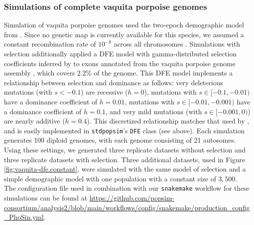 \documentclass[hidelinks]{article}
\newcommand{\stdpopsim}{\texttt{stdpopsim}\xspace}
\newcommand{\snakemake}{\texttt{snakemake}\xspace}
\begin{document}
    \subsubsection*{Simulations of complete vaquita porpoise genomes}
    Simulation of vaquita porpoise genomes used
    the two-epoch demographic model from \citet[\stdpopsim label \texttt{Vaquita2Epoch\_1R22}]{robinson2022critically}.
    Since no genetic map is currently available for this species, we assumed a constant recombination rate of $10^{-8}$
    across all chromosomes \citep{morin2021}.
    Simulations with selection additionally applied a DFE model with gamma-distributed selection coefficients inferred by
    \citet[\stdpopsim label \texttt{Gamma\_R22}]{robinson2022critically} to exons annotated from the vaquita porpoise genome assembly
    \citet[\stdpopsim label \texttt{Phocoena\_sinus.mPhoSin1.pri.110\_exons}]{morin2021},
    which covers 2.2\% of the genome. 
    This DFE model implements a relationship between selection and dominance as follows:
    very deleterious mutations (with $s<-0.1$) are recessive ($h=0$),
    mutations with $s\in [-0.1,-0.01)$ have a dominance coefficient of $h=0.01$,
    mutations with $s\in [-0.01,-0.001)$ have a dominance coefficient of $h=0.1$,
    and very mild mutations (with $s\in [-0.001,0)$) are nearly additive ($h=0.4$).
    This discretized relationship matches that used by \textcite{robinson2022critically},
    and is easily implemented in \stdpopsim's \texttt{DFE} class (see above). %
    Each simulation generates 100 diploid genomes,
    with each genome consisting of 21 autosomes.
    Using these settings, we generated three replicate datasets without selection
    and three replicate datasets with selection.
    Three additional datasets, used in Figure \ref{fig:vaquita-dfe.constant},
    were simulated with the same model of selection and a simple demographic model with one population with a constant size of $3,500$.
    The configuration file used in combination with our \snakemake workflow
    for these simulations can be found at
    \url{https://github.com/popsim-consortium/analysis2/blob/main/workflows/config/snakemake/production_config_PhoSin.yml}.
\end{document}
